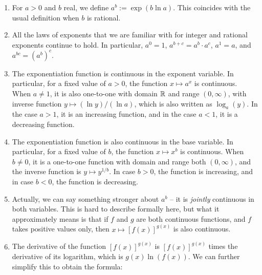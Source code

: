 \documentclass[10pt]{amsart}
\begin{document}
\begin{enumerate}

\item For $a > 0$ and $b$ real, we define $a^b := \exp(b \ln a)$. This
  coincides with the usual definition when $b$ is rational.
\item All the laws of exponents that we are familiar with for integer
  and rational exponents continue to hold. In particular, $a^0 = 1$,
  $a^{b + c} = a^b \cdot a^c$, $a^1 = a$, and $a^{bc} = (a^b)^c$.
\item The exponentiation function is continuous in the exponent
  variable. In particular, for a fixed value of $a > 0$, the function
  $x \mapsto a^x$ is continuous. When $a \ne 1$, it is also one-to-one
  with domain $\mathbb{R}$ and range $(0,\infty)$, with inverse function $y
  \mapsto (\ln y)/(\ln a)$, which is also written as $\log_a(y)$. In
  the case $a > 1$, it is an increasing function, and in the case $a <
  1$, it is a decreasing function.
\item The exponentiation function is also continuous in the base
  variable. In particular, for a fixed value of $b$, the function $x
  \mapsto x^b$ is continuous. When $b \ne 0$, it is a one-to-one
  function with domain and range both $(0,\infty)$, and the inverse
  function is $y \mapsto y^{1/b}$. In case $b > 0$, the function is
  increasing, and in case $b < 0$, the function is decreasing.
\item Actually, we can say something stronger about $a^b$ -- it is
  {\em jointly} continuous in both variables. This is hard to describe
  formally here, but what it approximately means is that if $f$ and
  $g$ are both continuous functions, and $f$ takes positive values
  only, then $x \mapsto [f(x)]^{g(x)}$ is also continuous.
\item The derivative of the function $[f(x)]^{g(x)}$ is
  $[f(x)]^{g(x)}$ times the derivative of its logarithm, which is
  $g(x)\ln(f(x))$. We can further simplify this to obtain the formula:


\end{enumerate}
\end{document}
